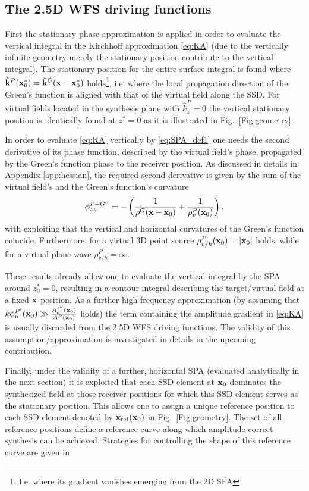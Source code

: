 \documentclass[lettersize,journal]{IEEEtran}
\begin{document}
\subsection{The 2.5D WFS driving functions}
First the stationary phase approximation is applied in order to evaluate the vertical integral in the Kirchhoff approximation \eqref{eq:KA} (due to the vertically infinite geometry merely the stationary position contribute to the vertical integral).
The stationary position for the entire surface integral is found where $\hat{\mathbf{k}}^P(\mathbf{x}_0^*) = \hat{\mathbf{k}}^G(\mathbf{x}-\mathbf{x}_0^*)$ holds\footnote{I.e. where its gradient vanishes emerging from the 2D SPA}, i.e. where the local propagation direction of the Green's function is aligned with that of the virtual field along the SSD.
For virtual fields located in the synthesis plane with $\hat{k}^P_z = 0$ the vertical stationary position is identically found at $z^* = 0$ as it is illustrated in Fig.~\ref{Fig:geometry}.

In order to evaluate \eqref{eq:KA} vertically by \eqref{eq:SPA_def1} one needs the second derivative of its phase function, described by the virtual field's phase, propagated by the Green's function phase to the receiver position.
As discussed in details in Appendix \ref{app:hessian}, the required second derivative is given by the sum of the virtual field's and the Green's function's curvature 
\begin{equation}
  \phi^{P+G''}_{zz} = -\left( \frac{1}{\rho^G(\mathbf{x}-\mathbf{x}_0)} + \frac{1}{\rho^P_v(\mathbf{x}_0)} \right),
\end{equation} 
with exploiting that the vertical and horizontal curvatures of the Green's function coincide.
Furthermore, for a virtual 3D point source $\rho^P_{v/h}(\mathbf{x}_0) = |\mathbf{x}_0|$ holds, while for a virtual plane wave $\rho^P_{v/h} = \infty$.

These results already allow one to evaluate the vertical integral by the SPA around $z^*_0 = 0$, resulting in a contour integral describing the target/virtual field at a fixed $\mathbf{x}$ position.
As a further high frequency approximation (by assuming that $k \phi^{P'}_{\mathrm{n}}(\mathbf{x}_0) \gg \frac{A^{P'}_{\mathrm{n}}(\mathbf{x}_0)}{A^P(\mathbf{x}_0)}$ holds) the term containing the amplitude gradient in \eqref{eq:KA} is usually discarded from the 2.5D WFS driving functions.
The validity of this assumption/approximation is investigated in details in the upcoming contribution.

Finally, under the validity of a further, horizontal SPA (evaluated analytically in the next section) it is exploited that each SSD element at $\mathbf{x}_0$ dominates the synthesized field at those receiver positions for which this SSD element serves as the stationary position.
This allows one to assign a unique reference position to each SSD element denoted by $\mathbf{x}_{\mathrm{ref}}(\mathbf{x}_0)$ in Fig.~\ref{Fig:geometry}.
The set of all reference positions define a reference curve along which amplitude correct synthesis can be achieved.
Strategies for controlling the shape of this reference curve are given in \cite{Firtha2019phd, Firtha2016}
\end{document}
